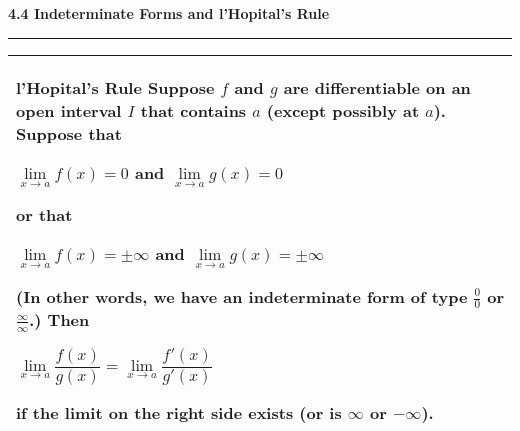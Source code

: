 \documentclass{article}
\begin{document}
% 
%

\begin{center}
\Large\textbf{4.4 Indeterminate Forms and l'Hopital's Rule}

\noindent\hfill\rule{0.3\textwidth}{.4pt}\hfill
\vspace{24pt}

\large
\def\arraystretch{1.3}
{\setlength{\tabcolsep}{16pt}
\begin{tabularx}{.9\textwidth}{|X|}
\hline
	\vspace{1pt}
	\textbf{l'Hopital's Rule} \: Suppose $f$ and $g$ are differentiable on an open interval $I$ that contains $a$ (except possibly at $a$). Suppose that 
	\begin{center}
	$\underset{x \to a}{\lim} f(x) = 0$ \hspace{36pt} and \hspace{36pt} $\underset{x \to a}{\lim} g(x) = 0$
	\end{center}
	or that 
	\begin{center}
	$\underset{x \to a}{\lim} f(x) = \pm \infty$ \hspace{36pt} and \hspace{36pt} $\underset{x \to a}{\lim} g(x) = \pm \infty$
	\end{center}
	(In other words, we have an indeterminate form of type $\frac{0}{0}$ or $\frac{\infty}{\infty}$.) Then 
	\begin{center}
	$\underset{x \to a}{\lim} \dfrac{f(x)}{g(x)} = \underset{x \to a}{\lim} \dfrac{f'(x)}{g'(x)}$
	\end{center}
	if the limit on the right side exists (or is $\infty$ or $-\infty$).
	\\[10pt]
	\hline
\end{tabularx}}
\end{center}
\end{document}
